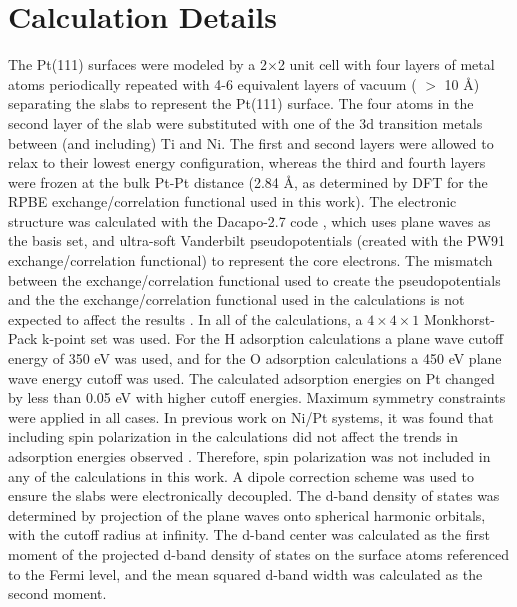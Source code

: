 \documentclass[aps,preprint,superscriptaddress,endfloats*]{revtex4}
\begin{document}
\section{Calculation Details}
The Pt(111) surfaces were modeled by a 2$\times$2 unit cell with four
layers of metal atoms periodically repeated with 4-6 equivalent layers
of vacuum ( $>$ 10 \AA ) separating the slabs to represent the Pt(111)
surface.  The four atoms in the second layer of the slab were
substituted with one of the 3d transition metals between (and
including) Ti and Ni.  The first and second layers were allowed to
relax to their lowest energy configuration, whereas the third and
fourth layers were frozen at the bulk Pt-Pt distance (2.84 \AA, as
determined by DFT for the RPBE exchange/correlation functional used in
this work).  The electronic structure was calculated with the
Dacapo-2.7 code \cite{campos}, which uses plane waves as the basis
set, and ultra-soft Vanderbilt pseudopotentials (created with the PW91
exchange/correlation functional) to represent the core electrons.  The
mismatch between the exchange/correlation functional used to create
the pseudopotentials and the the exchange/correlation functional used
in the calculations is not expected to affect the results
\cite{hammer1999:_improv_pbe}. In all of the calculations, a $4\times
4\times 1$ Monkhorst-Pack k-point set was used. For the H adsorption
calculations a plane wave cutoff energy of 350 eV was used, and for
the O adsorption calculations a 450 eV plane wave energy cutoff was
used. The calculated adsorption energies on Pt changed by less than
0.05 eV with higher cutoff energies.  Maximum symmetry constraints
were applied in all cases.  In previous work on Ni/Pt systems, it was
found that including spin polarization in the calculations did not
affect the trends in adsorption energies observed
\cite{kitchin2003:_elucid_ni_pt}.  Therefore, spin polarization was
not included in any of the calculations in this work.  A dipole
correction scheme was used to ensure the slabs were electronically
decoupled.  The d-band density of states was determined by projection
of the plane waves onto spherical harmonic orbitals, with the cutoff
radius at infinity.  The d-band center was calculated as the first
moment of the projected d-band density of states on the surface atoms
referenced to the Fermi level, and the mean squared d-band width was
calculated as the second moment.
\end{document}
